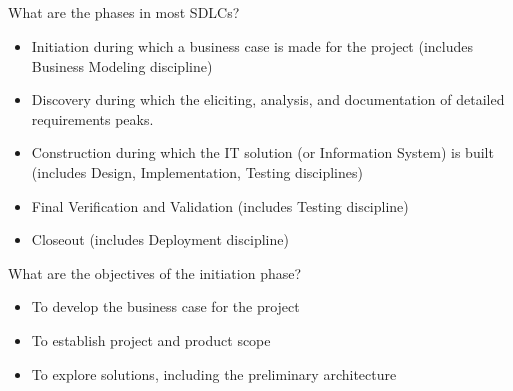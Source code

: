 \documentclass[10pt,a4paper]{exam}
\title{\choosedocumenttitle \vspace{-1ex}\begin{large}\em \modulename \end{large} \\}
\author{\chooseshowname}
\date{\choosedate}
\begin{document}
\maketitle
\thispagestyle{empty} %
\begin{questions}


\question What are the phases in most SDLCs?
\begin{solution}
\begin{itemize}

        \item Initiation during which a business case is made for the project (includes Business Modeling discipline)
        \item Discovery during which the eliciting, analysis, and documentation of detailed requirements peaks.
        \item Construction during which the IT solution (or Information System) is built (includes Design, Implementation, Testing disciplines)
        \item Final Verification and Validation (includes Testing discipline)
        \item Closeout (includes Deployment discipline)
        
\end{itemize}
\end{solution}


\question What are the objectives of the initiation phase?
\begin{solution}
\begin{itemize}

        \item To develop the business case for the project
        \item To establish project and product scope
        \item To explore solutions, including the preliminary architecture

\end{itemize}
\end{solution}



\end{questions}
\end{document}

